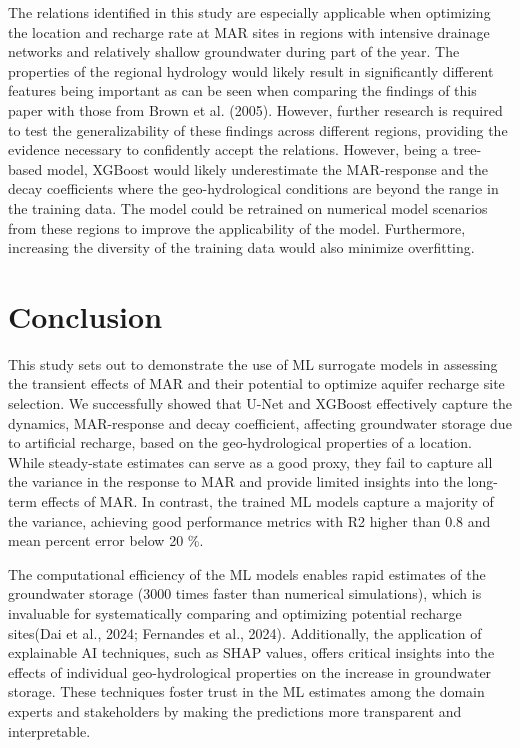 \documentclass[
]{agujournal2019}
\begin{document}
The relations identified in this study are especially applicable when
optimizing the location and recharge rate at MAR sites in regions with
intensive drainage networks and relatively shallow groundwater during
part of the year. The properties of the regional hydrology would likely
result in significantly different features being important as can be
seen when comparing the findings of this paper with those from Brown et
al. (2005). However, further research is required to test the
generalizability of these findings across different regions, providing
the evidence necessary to confidently accept the relations. However,
being a tree-based model, XGBoost would likely underestimate the
MAR-response and the decay coefficients where the geo-hydrological
conditions are beyond the range in the training data. The model could be
retrained on numerical model scenarios from these regions to improve the
applicability of the model. Furthermore, increasing the diversity of the
training data would also minimize overfitting.

\section{Conclusion}\label{conclusion}

This study sets out to demonstrate the use of ML surrogate models in
assessing the transient effects of MAR and their potential to optimize
aquifer recharge site selection. We successfully showed that U-Net and
XGBoost effectively capture the dynamics, MAR-response and decay
coefficient, affecting groundwater storage due to artificial recharge,
based on the geo-hydrological properties of a location. While
steady-state estimates can serve as a good proxy, they fail to capture
all the variance in the response to MAR and provide limited insights
into the long-term effects of MAR. In contrast, the trained ML models
capture a majority of the variance, achieving good performance metrics
with R2 higher than 0.8 and mean percent error below 20 \%.

The computational efficiency of the ML models enables rapid estimates of
the groundwater storage (3000 times faster than numerical simulations),
which is invaluable for systematically comparing and optimizing
potential recharge sites(Dai et al., 2024; Fernandes et al., 2024).
Additionally, the application of explainable AI techniques, such as SHAP
values, offers critical insights into the effects of individual
geo-hydrological properties on the increase in groundwater storage.
These techniques foster trust in the ML estimates among the domain
experts and stakeholders by making the predictions more transparent and
interpretable.
\end{document}
